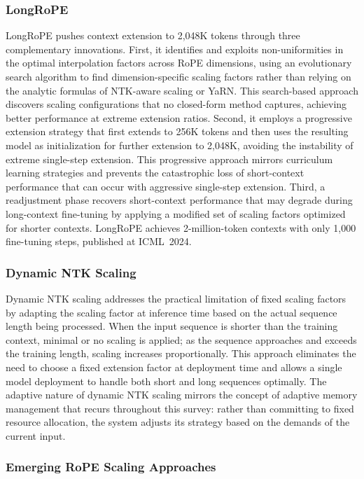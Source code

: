 \documentclass[11pt,letterpaper]{article}
\begin{document}
\subsubsection{LongRoPE}

LongRoPE \cite{ding2024longrope} pushes context extension to 2,048K tokens through three complementary innovations. First, it identifies and exploits non-uniformities in the optimal interpolation factors across RoPE dimensions, using an evolutionary search algorithm to find dimension-specific scaling factors rather than relying on the analytic formulas of NTK-aware scaling or YaRN. This search-based approach discovers scaling configurations that no closed-form method captures, achieving better performance at extreme extension ratios. Second, it employs a progressive extension strategy that first extends to 256K tokens and then uses the resulting model as initialization for further extension to 2,048K, avoiding the instability of extreme single-step extension. This progressive approach mirrors curriculum learning strategies and prevents the catastrophic loss of short-context performance that can occur with aggressive single-step extension. Third, a readjustment phase recovers short-context performance that may degrade during long-context fine-tuning by applying a modified set of scaling factors optimized for shorter contexts. LongRoPE achieves 2-million-token contexts with only 1,000 fine-tuning steps, published at ICML~2024.

\subsubsection{Dynamic NTK Scaling}

Dynamic NTK scaling addresses the practical limitation of fixed scaling factors by adapting the scaling factor at inference time based on the actual sequence length being processed. When the input sequence is shorter than the training context, minimal or no scaling is applied; as the sequence approaches and exceeds the training length, scaling increases proportionally. This approach eliminates the need to choose a fixed extension factor at deployment time and allows a single model deployment to handle both short and long sequences optimally. The adaptive nature of dynamic NTK scaling mirrors the concept of adaptive memory management that recurs throughout this survey: rather than committing to fixed resource allocation, the system adjusts its strategy based on the demands of the current input.

\subsubsection{Emerging RoPE Scaling Approaches}
\end{document}
